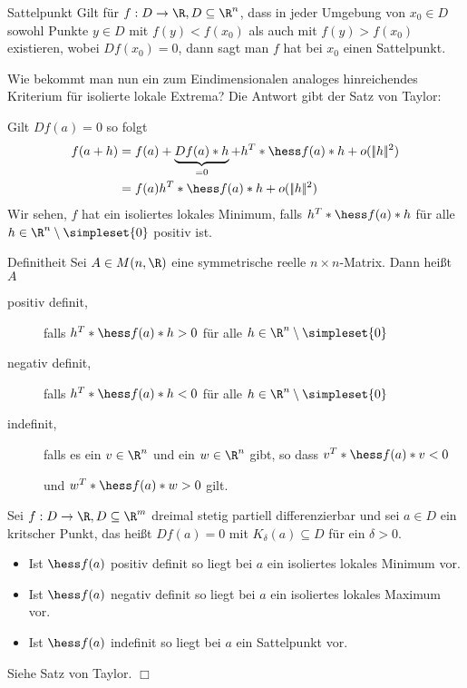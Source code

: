\begin{definition}{Sattelpunkt}
	Gilt für $f:D\rightarrow \R,D\subseteq \R^n$, dass in jeder Umgebung von $x_0\in D$ sowohl Punkte $y\in D$ mit $f(y)<f(x_0)$ als auch mit $f(y)>f(x_0)$ existieren, wobei $Df(x_0)=0$, dann sagt man $f$ hat bei $x_0$ einen Sattelpunkt.
\end{definition}

Wie bekommt man nun ein zum Eindimensionalen analoges hinreichendes Kriterium für isolierte lokale Extrema? Die Antwort gibt der Satz von Taylor:

Gilt $Df(a)=0$ so folgt
\begin{align*}
	f(a+h)&=f(a)+\underbrace{Df(a)*h}_{=0}+h^T*\hess f(a)*h+o(|\!|h|\!|^2)\\
	&=f(a)h^T*\hess f(a)*h+o(|\!|h|\!|^2)
\end{align*}
Wir sehen, $f$ hat ein isoliertes lokales Minimum, falls $h^T*\hess f(a)*h$ für alle $h\in\R^n\setminus\simpleset{0}$ positiv ist.

\begin{definition}{Definitheit}
	Sei $A\in M(n,\R)$ eine symmetrische reelle $n\times n$-Matrix. Dann heißt $A$
	\begin{description}
		\item [positiv definit,] falls $h^T*\hess f(a)*h>0$ für alle $h\in\R^n\setminus\simpleset{0}$
		\item [negativ definit,] falls $h^T*\hess f(a)*h<0$ für alle $h\in\R^n\setminus\simpleset{0}$
		\item [indefinit,] falls es ein $v\in\R^n$ und ein $w\in\R^n$ gibt, so dass $v^T*\hess f(a)*v<0$

		und $w^T*\hess f(a)*w>0$ gilt.
	\end{description}
\end{definition}

\begin{satz}{}
	Sei $f:D\rightarrow \R,D\subseteq\R^m$ dreimal stetig partiell differenzierbar und sei $a\in D$ ein kritscher Punkt, das heißt $Df(a)=0$ mit $K_\delta (a)\subseteq D$ für ein $\delta>0$.
	\begin{itemize}
		\item Ist $\hess f(a)$ positiv definit so liegt bei $a$ ein isoliertes lokales Minimum vor.
		\item Ist $\hess f(a)$ negativ definit so liegt bei $a$ ein isoliertes lokales Maximum vor.
		\item Ist $\hess f(a)$ indefinit so liegt bei $a$ ein Sattelpunkt vor.
	\end{itemize}
\end{satz}
\begin{beweis}
	Siehe Satz von Taylor. \hfill $\Box$
\end{beweis}

